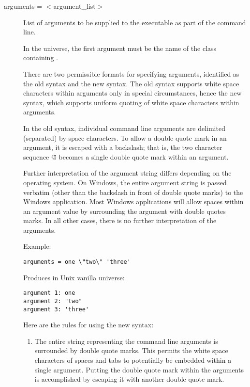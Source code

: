 \begin{description} 


\label{man-condor-submit-arguments}
\item[arguments = $<$argument\_list$>$]
List of arguments to be supplied
to the executable as part of the command line.

In the  universe, the first
argument must be the name of the class containing .

There are two permissible formats for specifying arguments,
identified as the old syntax and the new syntax.
The old syntax supports white space characters within arguments
only in special circumstances,
hence the new syntax, 
which supports uniform quoting of white space characters within arguments.


In the old syntax, individual command line arguments are delimited 
(separated) by space characters.
To allow a double quote mark in an argument,
it is escaped with a backslash; that is,
the two character sequence \verb@\"@
becomes a single double quote mark within an argument.

Further interpretation of the argument string differs depending on the
operating system.  On Windows, the entire argument string is
passed verbatim (other than the backslash in front of double quote marks)
to the Windows application.  
Most Windows applications
will allow spaces within an argument value by surrounding
the argument with double quotes marks.
In all
other cases, there is no further interpretation of the arguments.

Example:

\begin{verbatim}
arguments = one \"two\" 'three'
\end{verbatim}

Produces in Unix vanilla universe:

\begin{verbatim}
argument 1: one
argument 2: "two"
argument 3: 'three'
\end{verbatim}


Here are the rules for using the new syntax:

\begin{enumerate}

\item The entire string representing the command line arguments is
surrounded by double quote marks.
This permits the white space characters of spaces and tabs to potentially
be embedded within a single argument. 
Putting the double quote mark within the arguments
is accomplished by escaping it with another double quote mark.


\end{enumerate}
\end{description}

